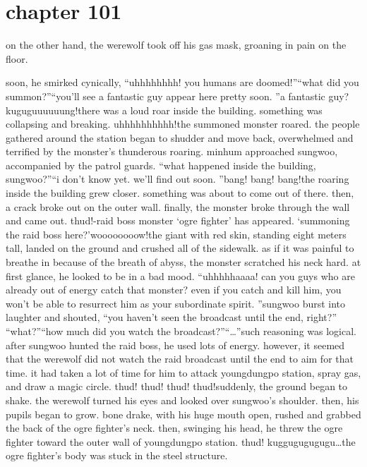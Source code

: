 \section{chapter 101}

                            on the other hand, the werewolf took off his gas mask, groaning in pain on the floor.





soon, he smirked cynically, “uhhhhhhhh! you humans are doomed!”“what did you summon?”“you’ll see a fantastic guy appear here pretty soon.
”a fantastic guy?kuguguuuuuung!there was a loud roar inside the building.
 something was collapsing and breaking.
uhhhhhhhhhh!the summoned monster roared.
 the people gathered around the station began to shudder and move back, overwhelmed and terrified by the monster’s thunderous roaring.
minhum approached sungwoo, accompanied by the patrol guards.
“what happened inside the building, sungwoo?”“i don’t know yet.
 we’ll find out soon.
”bang! bang! bang!the roaring inside the building grew closer.
 something was about to come out of there.
 then, a crack broke out on the outer wall.
finally, the monster broke through the wall and came out.
thud!-raid boss monster ‘ogre fighter’ has appeared.
‘summoning the raid boss here?’woooooooow!the giant with red skin, standing eight meters tall, landed on the ground and crushed all of the sidewalk.
 as if it was painful to breathe in because of the breath of abyss, the monster scratched his neck hard.
 at first glance, he looked to be in a bad mood.
“uhhhhhaaaa! can you guys who are already out of energy catch that monster? even if you catch and kill him, you won’t be able to resurrect him as your subordinate spirit.
”sungwoo burst into laughter and shouted, “you haven’t seen the broadcast until the end, right?”
“what?”“how much did you watch the broadcast?”“…”such reasoning was logical.
 after sungwoo hunted the raid boss, he used lots of energy.
 however, it seemed that the werewolf did not watch the raid broadcast until the end to aim for that time.
 it had taken a lot of time for him to attack youngdungpo station, spray gas, and draw a magic circle.
thud! thud! thud! thud!suddenly, the ground began to shake.
 the werewolf turned his eyes and looked over sungwoo’s shoulder.
 then, his pupils began to grow.
bone drake, with his huge mouth open, rushed and grabbed the back of the ogre fighter’s neck.
then, swinging his head, he threw the ogre fighter toward the outer wall of youngdungpo station.
thud! kuggugugugugu…the ogre fighter’s body was stuck in the steel structure.
